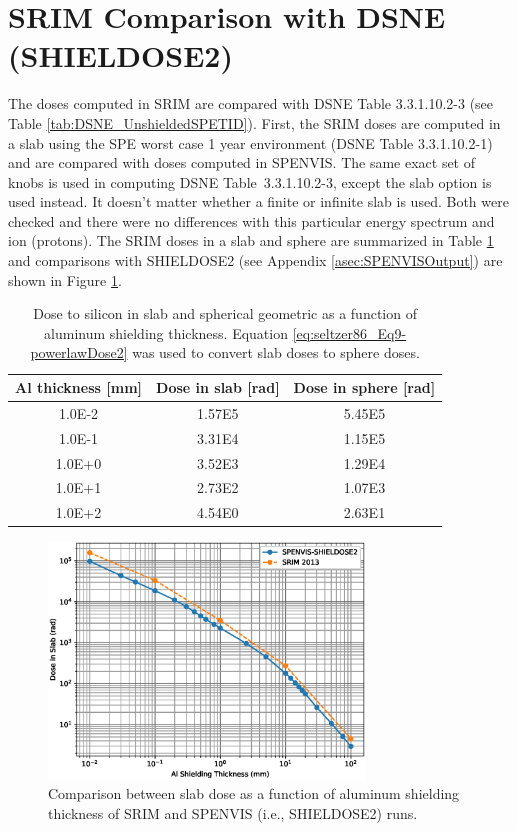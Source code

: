 \documentclass{hitec}
\begin{document}
\section{SRIM Comparison with DSNE (SHIELDOSE2)}

The doses computed in SRIM are compared with DSNE Table 3.3.1.10.2-3 (see Table \ref{tab:DSNE_UnshieldedSPETID}). First, the SRIM doses are computed in a slab using the SPE worst case 1 year environment (DSNE Table 3.3.1.10.2-1) and are compared with doses computed in SPENVIS. The same exact set of knobs is used in computing DSNE Table~3.3.1.10.2-3, except the \textsf{slab} option is used instead. It doesn't matter whether a finite or infinite slab is used. Both were checked and there were no differences with this particular energy spectrum and ion (protons). The SRIM doses in a slab and sphere are summarized in Table \ref{tab:SRIM_doses} and comparisons with SHIELDOSE2 (see Appendix \ref{asec:SPENVISOutput}) are shown in Figure \ref{fig:Dose_vs_shielding_slab_comparison}.

\begin{table}[h]\centering
	\caption{Dose to silicon in slab and spherical geometric as a function of aluminum shielding thickness. Equation \eqref{eq:seltzer86_Eq9-powerlawDose2} was used to convert slab doses to sphere doses.}\label{tab:SRIM_doses}
	\begin{tabular}{|c | c | c |}\hline
		Al thickness [mm] & Dose in slab [rad] & Dose in sphere [rad]  \\\hline
		1.0E-2 & 1.57E5 & 5.45E5 \\\hline
		1.0E-1 & 3.31E4 & 1.15E5 \\\hline
		1.0E+0 & 3.52E3 & 1.29E4 \\\hline
		1.0E+1 & 2.73E2 & 1.07E3 \\\hline
		1.0E+2 & 4.54E0 & 2.63E1 \\\hline
	\end{tabular}
\end{table}

\begin{figure}[h!]
	\centering
	\includegraphics[width=0.75\textwidth]{Dose_vs_shielding_slab_comparison.eps}
	\caption{Comparison between slab dose as a function of aluminum shielding thickness of SRIM and SPENVIS (i.e., SHIELDOSE2) runs.}\label{fig:Dose_vs_shielding_slab_comparison}
\end{figure}
\end{document}
